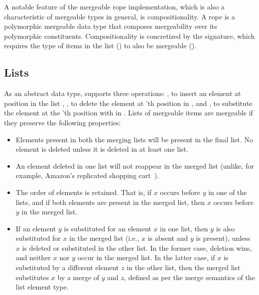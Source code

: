 A notable feature of the mergeable rope implementation, which is also
a characteristic of mergeable types in general, is compositionality. A
rope is a polymorphic mergeable data type that composes mergeability
over its polymorphic constituents.  Compositionality is concretized by
the  signature, which requires the type of items in the list
() to also be mergeable ().

\subsection{Lists}
\label{sec:lists}



As an abstract data type,  supports three operations:
, to insert an element  at position  in the
list , , to delete the element at 'th position
in , and , to substitute the element at the
'th position with  in .  Lists of mergeable items are
mergeable if they preserve the following properties:
\begin{itemize}
  \item Elements present in both the merging lists will be present in
  the final list. No element is deleted unless it is deleted in at
  least one list.
  \item An element deleted in one list will not reappear in the merged
  list (unlike, for example, Amazon's replicated shopping cart~\cite{Dynamo}).
  \item The order of elements is retained. That is, if $x$ occurs
  before $y$ in one of the lists, and if both elements are present in
  the merged list, then $x$ occurs before $y$ in the merged list.
\item If an element $y$ is substituted for an element $x$ in one list,
  then $y$ is also substituted for $x$ in the merged list (i.e., $x$
  is absent and $y$ is present), unless $x$ is deleted or substituted
  in the other list. In the former case, deletion wins, and neither
  $x$ nor $y$ occur in the merged list. In the latter case, if $x$ is
  substituted by a different element $z$ in the other list, then the
  merged list substitutes $x$ by a merge of $y$ and $z$, defined as
  per the merge semantics of the list element type.
\end{itemize}

